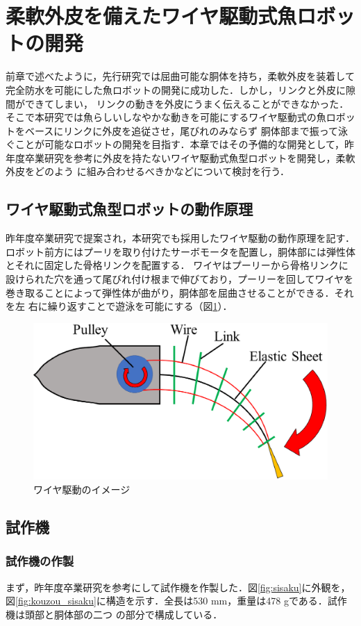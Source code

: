 \newpage
\section{柔軟外皮を備えたワイヤ駆動式魚ロボットの開発}
前章で述べたように，先行研究\cite{kyu}では屈曲可能な胴体を持ち，柔軟外皮を装着して完全防水を可能にした魚ロボットの開発に成功した．しかし，リンクと外皮に隙間ができてしまい，
リンクの動きを外皮にうまく伝えることができなかった．そこで本研究では魚らしいしなやかな動きを可能にするワイヤ駆動式の魚ロボットをベースにリンクに外皮を追従させ，尾びれのみならず
胴体部まで振って泳ぐことが可能なロボットの開発を目指す．本章ではその予備的な開発として，昨年度卒業研究を参考に外皮を持たないワイヤ駆動式魚型ロボットを開発し，柔軟外皮をどのよう
に組み合わせるべきかなどについて検討を行う．
\subsection{ワイヤ駆動式魚型ロボットの動作原理}
昨年度卒業研究で提案され，本研究でも採用したワイヤ駆動の動作原理を記す．ロボット前方にはプーリを取り付けたサーボモータを配置し，胴体部には弾性体とそれに固定した骨格リンクを配置する．
ワイヤはプーリーから骨格リンクに設けられた穴を通って尾びれ付け根まで伸びており，プーリーを回してワイヤを巻き取ることによって弾性体が曲がり，胴体部を屈曲させることができる．それを左
右に繰り返すことで遊泳を可能にする（図\ref{fig:waiyakudou}）．

\begin{figure}[b]
   \centering
   \includegraphics[width=0.6\linewidth]{chapters/picture/waiyakudou.eps}
   \caption{ワイヤ駆動のイメージ}
   \label{fig:waiyakudou}
\end{figure}

\subsection{試作機}
\subsubsection{試作機の作製}
まず，昨年度卒業研究を参考にして試作機を作製した．図\ref{fig:sisaku}に外観を，図\ref{fig:kouzou_sisaku}に構造を示す．全長は530 mm，重量は478 gである．試作機は頭部と胴体部の二つ
の部分で構成している．

